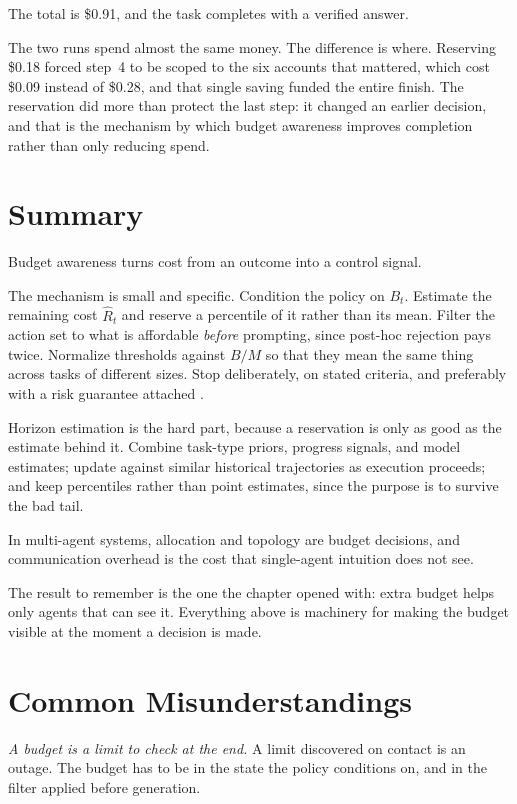 \documentclass[11pt]{book}
\begin{document}
The total is \$0.91, and the task completes with a verified answer.

The two runs spend almost the same money. The difference is where. Reserving \$0.18 forced step~4 to be scoped to the six accounts that mattered, which cost \$0.09 instead of \$0.28, and that single saving funded the entire finish. The reservation did more than protect the last step: it changed an earlier decision, and that is the mechanism by which budget awareness improves completion rather than only reducing spend.

\section{Summary}

Budget awareness turns cost from an outcome into a control signal.

The mechanism is small and specific. Condition the policy on $B_t$. Estimate the remaining cost $\hat{R}_t$ and reserve a percentile of it rather than its mean. Filter the action set to what is affordable \textit{before} prompting, since post-hoc rejection pays twice. Normalize thresholds against $B/M$ so that they mean the same thing across tasks of different sizes. Stop deliberately, on stated criteria, and preferably with a risk guarantee attached \cite{conformalthinking2026}.

Horizon estimation is the hard part, because a reservation is only as good as the estimate behind it. Combine task-type priors, progress signals, and model estimates; update against similar historical trajectories as execution proceeds; and keep percentiles rather than point estimates, since the purpose is to survive the bad tail.

In multi-agent systems, allocation and topology are budget decisions, and communication overhead is the cost that single-agent intuition does not see.

The result to remember is the one the chapter opened with: extra budget helps only agents that can see it. Everything above is machinery for making the budget visible at the moment a decision is made.

\section{Common Misunderstandings}

\textit{A budget is a limit to check at the end.} A limit discovered on contact is an outage. The budget has to be in the state the policy conditions on, and in the filter applied before generation.
\end{document}
